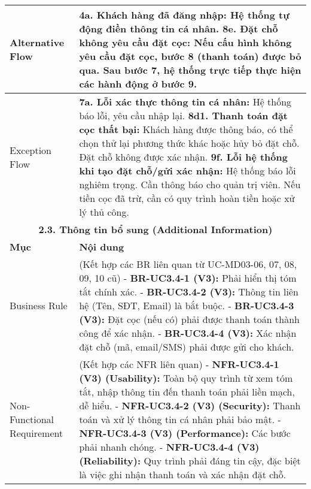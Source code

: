 \begin{longtable}{|m{4cm}|p{11cm}|}
\hline
Alternative Flow & \textbf{4a. Khách hàng đã đăng nhập:} Hệ thống tự động điền thông tin cá nhân. \newline \textbf{8e. Đặt chỗ không yêu cầu đặt cọc:} Nếu cấu hình không yêu cầu đặt cọc, bước 8 (thanh toán) được bỏ qua. Sau bước 7, hệ thống trực tiếp thực hiện các hành động ở bước 9. \\
\hline
Exception Flow & \textbf{7a. Lỗi xác thực thông tin cá nhân:} Hệ thống báo lỗi, yêu cầu nhập lại. \newline \textbf{8d1. Thanh toán đặt cọc thất bại:} Khách hàng được thông báo, có thể chọn thử lại phương thức khác hoặc hủy bỏ đặt chỗ. Đặt chỗ không được xác nhận. \newline \textbf{9f. Lỗi hệ thống khi tạo đặt chỗ/gửi xác nhận:} Hệ thống báo lỗi nghiêm trọng. Cần thông báo cho quản trị viên. Nếu tiền cọc đã trừ, cần có quy trình hoàn tiền hoặc xử lý thủ công. \\
\hline
\multicolumn{2}{|c|}{\textbf{2.3. Thông tin bổ sung (Additional Information)}} \\
\hline
\textbf{Mục} & \textbf{Nội dung} \\
\hline
Business Rule & (Kết hợp các BR liên quan từ UC-MD03-06, 07, 08, 09, 10 cũ) \newline - \textbf{BR-UC3.4-1 (V3):} Phải hiển thị tóm tắt chính xác. \newline - \textbf{BR-UC3.4-2 (V3):} Thông tin liên hệ (Tên, SĐT, Email) là bắt buộc. \newline - \textbf{BR-UC3.4-3 (V3):} Đặt cọc (nếu có) phải được thanh toán thành công để xác nhận. \newline - \textbf{BR-UC3.4-4 (V3):} Xác nhận đặt chỗ (mã, email/SMS) phải được gửi cho khách. \\
\hline
Non-Functional Requirement & (Kết hợp các NFR liên quan) \newline - \textbf{NFR-UC3.4-1 (V3) (Usability):} Toàn bộ quy trình từ xem tóm tắt, nhập thông tin đến thanh toán phải liền mạch, dễ hiểu. \newline - \textbf{NFR-UC3.4-2 (V3) (Security):} Thanh toán và xử lý thông tin cá nhân phải bảo mật. \newline - \textbf{NFR-UC3.4-3 (V3) (Performance):} Các bước phải nhanh chóng. \newline - \textbf{NFR-UC3.4-4 (V3) (Reliability):} Quy trình phải đáng tin cậy, đặc biệt là việc ghi nhận thanh toán và xác nhận đặt chỗ. \\
\hline
\end{longtable}

